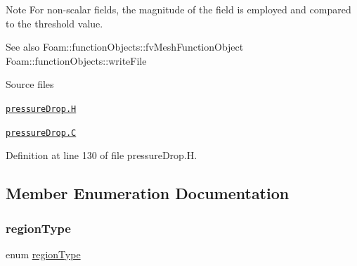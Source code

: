 \begin{DoxyNote}{Note}
For non-\/scalar fields, the magnitude of the field is employed and compared to the threshold value.
\end{DoxyNote}
\begin{DoxySeeAlso}{See also}
Foam\+::function\+Objects\+::fv\+Mesh\+Function\+Object Foam\+::function\+Objects\+::write\+File
\end{DoxySeeAlso}
\begin{DoxyParagraph}{Source files}

\begin{DoxyItemize}
\item \href{../../../home/carlo/data/GeN-Foam/GeN-Foam_ffn/GeN-Foam/GeN-Foam/classes/thermalHydraulics/src/functionObjects/pressureDrop/pressureDrop.H}{\tt pressure\+Drop.\+H} 
\item \href{../../../home/carlo/data/GeN-Foam/GeN-Foam_ffn/GeN-Foam/GeN-Foam/classes/thermalHydraulics/src/functionObjects/pressureDrop/pressureDrop.C}{\tt pressure\+Drop.\+C} 
\end{DoxyItemize}
\end{DoxyParagraph}


Definition at line 130 of file pressure\+Drop.\+H.



\subsection{Member Enumeration Documentation}
\mbox{\label{classFoam_1_1functionObjects_1_1pressureDrop_a2c25b4a3d851e2d45d7a435a73598323}} 
\subsubsection{\texorpdfstring{region\+Type}{regionType}}
{\footnotesize\ttfamily enum \hyperlink{classFoam_1_1functionObjects_1_1pressureDrop_a2c25b4a3d851e2d45d7a435a73598323}{region\+Type}}

